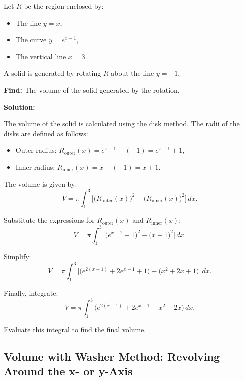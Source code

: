 \documentclass[12pt]{article}
\theoremstyle{beautifulthm}
\begin{document}
\begin{tcolorbox}[colback=examplebg, colframe=red!75!black, title=\textbf{EXAMPLE 2: Volume of Solid Generated by Rotating Region \( R \)}, fonttitle=\bfseries, sharp corners]

Let \( R \) be the region enclosed by:
\begin{itemize}
    \item The line \( y = x \),
    \item The curve \( y = e^{x-1} \),
    \item The vertical line \( x = 3 \).
\end{itemize}

A solid is generated by rotating \( R \) about the line \( y = -1 \).

\textbf{Find:} The volume of the solid generated by the rotation.

\tcblower
\textbf{Solution:} 

The volume of the solid is calculated using the disk method. The radii of the disks are defined as follows:
\begin{itemize}
    \item Outer radius: \( R_{\text{outer}}(x) = e^{x-1} - (-1) = e^{x-1} + 1 \),
    \item Inner radius: \( R_{\text{inner}}(x) = x - (-1) = x + 1 \).
\end{itemize}

The volume is given by:
\[
V = \pi \int_{1}^{3} \Big[ \big( R_{\text{outer}}(x) \big)^2 - \big( R_{\text{inner}}(x) \big)^2 \Big] \, dx.
\]

Substitute the expressions for \( R_{\text{outer}}(x) \) and \( R_{\text{inner}}(x) \):
\[
V = \pi \int_{1}^{3} \Big[ \big( e^{x-1} + 1 \big)^2 - \big( x + 1 \big)^2 \Big] \, dx.
\]

Simplify:
\[
V = \pi \int_{1}^{3} \Big[ \big( e^{2(x-1)} + 2e^{x-1} + 1 \big) - \big( x^2 + 2x + 1 \big) \Big] \, dx.
\]

Finally, integrate:
\[
V = \pi \int_{1}^{3} \Big( e^{2(x-1)} + 2e^{x-1} - x^2 - 2x \Big) \, dx.
\]

Evaluate this integral to find the final volume.
\end{tcolorbox}



\subsection{Volume with Washer Method: Revolving Around the x- or y-Axis}
\end{document}
